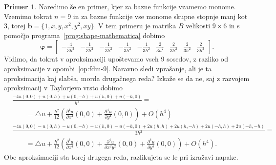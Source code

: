 \documentclass[12pt,a4paper]{article}
\theoremstyle{definition} %
\newtheorem{primer}[definicija]{Primer}
\theoremstyle{plain} %
\numberwithin{equation}{section}
\renewcommand{\b}{\boldsymbol}
\renewcommand{\phi}{\varphi}
\newcommand{\dpar}[2]{\ensuremath{\frac{\partial #1}{\partial #2}}}
\begin{document}
\begin{primer}
  Naredimo še en primer, kjer za bazne funkcije vzamemo monome. Vzemimo tokrat
  $n = 9$ in za bazne funkcije vse monome skupne stopnje manj kot 3, torej $\b b = \{1,
  x, y, x^2, y^2, xy\}$. V tem primeru je matrika $B$ velikosti $9\times 6$ in
  s pomočjo programa~\ref{prog:shape-mathematica} dobimo
  \[
    \b\phi =
    \begin{bmatrix}
-\frac{4}{3 h^2} & -\frac{1}{3 h^2} & -\frac{1}{3 h^2} & -\frac{1}{3 h^2} &
-\frac{1}{3 h^2} & \frac{2}{3 h^2} & \frac{2}{3 h^2} & \frac{2}{3 h^2} &
\frac{2}{3 h^2}
    \end{bmatrix}.
  \]
  Vidimo, da tokrat v aproksimaciji upoštevamo vseh 9 sosedov, z razliko od
  aproksimacije v opombi~\ref{op:fdm-9}. Naravno sledi vprašanje, ali je ta
  aproksimacija kaj slabša, morda drugačnega reda? Izkaže se da ne, saj z
  razvojem aproksimacij v Taylorjevo vrsto dobimo
  \scriptsize
  \begin{align*}
    &\frac{-4 u(0, 0) + u(0, h) + u(0, -h) + u(h, 0) + u(-h, 0)}{h^2} = \\
    & \qquad = \triangle u + \frac{h^2}{12}\left(\dpar{^4u}{x^4}(0,0) +
  \dpar{^4u}{y^4}(0, 0)\right) + O(h^4) \\
    &\frac{-4 u(0, 0) - u(0, h) - u(0, -h) - u(h, 0) - u(-h, 0)
    + 2u(h, h) + 2u(h, -h) + 2u(-h, h) + 2u(-h, -h)}{3h^2} = \\
    & \qquad =
    \triangle u + \frac{h^2}{12}\left(\dpar{^4u}{x^4}(0,0) + \dpar{^4u}{x^2y^2}(0,0) +
    \dpar{^4u}{y^4}(0, 0)\right) + O(h^4).
  \end{align*}
  \normalsize
  Obe aproksimaciji sta torej drugega reda, razlikujeta se le pri izražavi
  napake.
\end{primer}
\end{document}
